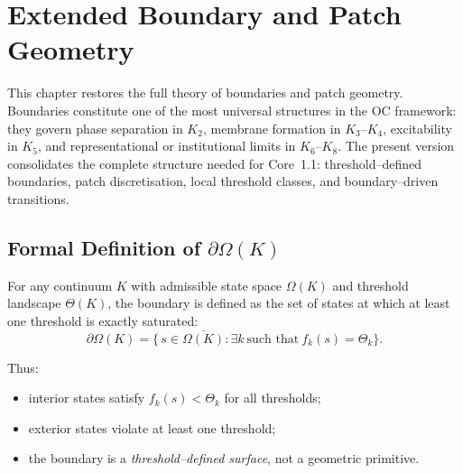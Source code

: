 
\section{Extended Boundary and Patch Geometry}
\label{sec:boundary-extended}

This chapter restores the full theory of boundaries and patch geometry.
Boundaries constitute one of the most universal structures in the OC framework:
they govern phase separation in \(K_2\), membrane formation in \(K_3\)--\(K_4\),
excitability in \(K_5\), and representational or institutional limits in
\(K_6\)--\(K_8\).  
The present version consolidates the complete structure needed for Core~1.1:
threshold–defined boundaries, patch discretisation, local threshold classes,
and boundary–driven transitions.

\subsection{Formal Definition of \texorpdfstring{$\partial\Omega(K)$}{boundary}}

For any continuum \(K\) with admissible state space \(\Omega(K)\) and threshold
landscape \(\Theta(K)\), the boundary is defined as the set of states at which
at least one threshold is exactly saturated:
\[
  \partial\Omega(K)
  =
  \big\{\, s \in \overline{\Omega(K)} :
          \exists k\ \text{such that}\ f_k(s) = \Theta_k \big\}.
\]

Thus:
\begin{itemize}
    \item interior states satisfy \(f_k(s) < \Theta_k\) for all thresholds;
    \item exterior states violate at least one threshold;
    \item the boundary is a \emph{threshold–defined surface}, not a geometric
          primitive.
\end{itemize}

